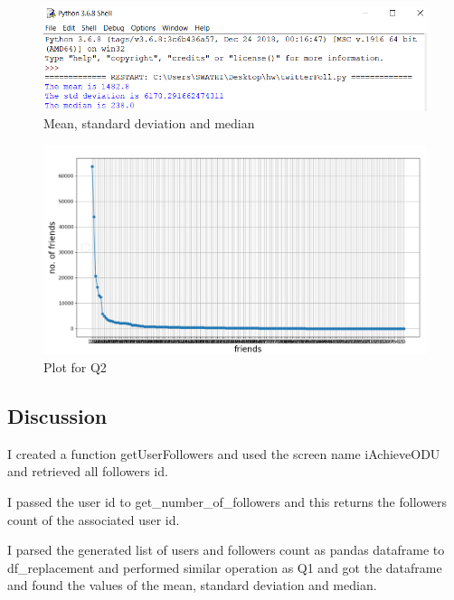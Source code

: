 \documentclass[12pt]{article}
\begin{document}
\begin{figure}[h]
    \centering
    \includegraphics[trim=0 0 0 0, clip, width=\textwidth] {Capture3.PNG}
    \caption{Mean, standard deviation and median}
    \label{fig:web-growth}
\end{figure}

\begin{figure}[h]
    \centering
    \includegraphics[trim=0 0 0 8, clip, width=\textwidth] {Capture2.PNG}
    \caption{Plot for Q2}
    \label{fig:web-growth}
\end{figure}
\subsection*{Discussion}
I created a function getUserFollowers and used the screen name iAchieveODU and retrieved all followers id.

I passed the user id to get\_number\_of\_followers and this returns the followers count of the associated user id. 

I parsed the generated list of users and followers count as pandas dataframe to df\_replacement and performed similar operation as Q1 and got the dataframe and found the values of the mean, standard deviation and median.
\end{document}
